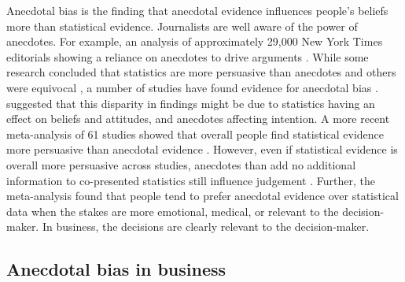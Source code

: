 \documentclass[a4paper, nobind, dvipsnames]{templates/ociamthesis}
\theoremstyle{definition}
\theoremstyle{definition}
\theoremstyle{definition}
\theoremstyle{definition}
\theoremstyle{remark}
\begin{document}
Anecdotal bias is the finding that anecdotal evidence influences people's
beliefs more than statistical evidence. Journalists are well aware of the power
of anecdotes. For example, an analysis of approximately 29,000 New York Times
editorials showing a reliance on anecdotes to drive arguments \autocite{alkhatib2017}.
While some research concluded that statistics are more persuasive than anecdotes
\autocites[e.g.,][]{allen1997,hornikx2005,hoeken2001} and others were equivocal
\autocite{winterbottom2008}, a number of studies have found evidence for anecdotal bias
\autocites[e.g.,][]{reinard1988,shen2015,jaramillo2019,ratcliff2020,reinhart2006}.
\textcite{zebregs2015} suggested that this disparity in findings might be due to
statistics having an effect on beliefs and attitudes, and anecdotes affecting
intention. A more recent meta-analysis of 61 studies showed that overall people
find statistical evidence more persuasive than anecdotal evidence
\autocite{freling2020}. However, even if statistical evidence is overall more persuasive
across studies, anecdotes than add no additional information to co-presented
statistics still influence judgement \autocite{jaramillo2019}. Further, the
meta-analysis found that people tend to prefer anecdotal evidence over
statistical data when the stakes are more emotional, medical, or relevant to the
decision-maker. In business, the decisions are clearly relevant to the
decision-maker.

\hypertarget{anecdotal-bias-in-business}{%
\subsection{Anecdotal bias in business}\label{anecdotal-bias-in-business}}
\end{document}
